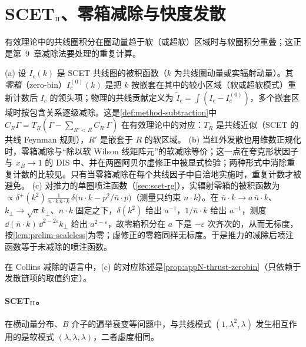 \section{SCET\texorpdfstring{$_{\rm II}$}{II}、零箱减除与快度发散}\label{sec:scet-scet2}

有效理论中的共线圈积分在圈动量趋于软（或超软）区域时与软圈积分重叠；这正是第~9~章减除法要处理的重复计算。

\begin{definition}[零箱减除]\label{def:scet-zero-bin}
(a) 设 $I_c(k)$ 是 SCET 共线图的被积函数（$k$ 为共线圈动量或实辐射动量）。其\emph{零箱}（zero-bin）$I_c^{(0)}(k)$ 是把 $k$ 按嵌套在其中的较小区域（软或超软模式）重新计数后 $I_c$ 的领头项；物理的共线贡献定义为 $\tilde I_c=\int(I_c-I_c^{(0)})$，多个嵌套区域时按包含关系逐级减除\cite{ManoharStewart2007}。这是\cref{def:method-subtraction}中 $C_R\Gamma=T_R(\Gamma-\sum_{R'<R}C_{R'}\Gamma)$ 在有效理论中的对应：$T_R$ 是共线近似（SCET 的共线 Feynman 规则），$R'$ 是嵌套于 $R$ 的软区域。
(b) 当红外发散也用维数正规化时，零箱减除与“除以软 Wilson 线矩阵元”的软减除等价；这一点在夸克形状因子与 $x_B\to1$ 的 DIS 中、并在两圈阿贝尔虚修正中被显式检验\cite{IdilbiMehen2007}；两种形式中消除重复计数的比较见\cite{Lee:2006nr}。只有当零箱减除在每个共线因子中自洽地实施时，重复计数才被避免。
(c) 对推力的单圈喷注函数（\cref{sec:scet-rg}），实辐射零箱的被积函数为 $\propto\delta^+(k^2)\,\frac{1}{n\cdot k\,\bar n\cdot k}\,\delta\big(n\cdot k-p^2/\bar n\cdot p\big)$（测量只约束 $n\cdot k$）。在 $\bar n\cdot k\to a\,\bar n\cdot k$、$k_\perp\to\sqrt a\,k_\perp$、$n\cdot k$ 固定之下，$\delta(k^2)$ 给出 $a^{-1}$，$1/\bar n\cdot k$ 给出 $a^{-1}$，测度 $\dd(\bar n\cdot k)\,\dd^{2-2\varepsilon}k_\perp$ 给出 $a^{2-\varepsilon}$，故零箱积分在 $a$ 下是 $-\varepsilon$ 次齐次的，从而无标度，按\cref{lem:prelim-scaleless}为零；虚修正的零箱同样无标度。于是推力的减除后喷注函数等于未减除的喷注函数。%
\end{definition}

在 Collins 减除的语言中，(c) 的对应陈述是\cref{prop:appN-thrust-zerobin}（只依赖于发散链项的取值约定）。

\paragraph{SCET$_{\rm II}$。}
在横动量分布、$B$ 介子的遍举衰变等问题中，与共线模式 $(1,\lambda^2,\lambda)$ 发生相互作用的是软模式 $(\lambda,\lambda,\lambda)$，二者虚度相同。


